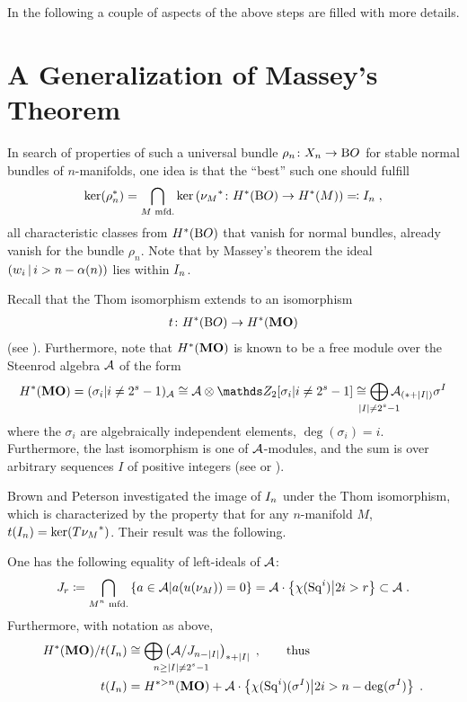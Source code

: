 In the following a couple of aspects of the above steps are filled
with more details.


\section*{A Generalization of Massey's Theorem}
In search of properties of such a universal bundle
$\rho_n\colon X_n\to\mathrm{B}O$ for stable normal bundles of $n$-manifolds,
one idea is that the \enquote{best} such one should fulfill
\begin{gather*}
  \ker({\rho}^*_n)
  = \bigcap_{\text{$M$ mfd.}}
  \ker\left({\nu_{M}}^*\colon H^*(\mathrm{B}O)\to H^*(M)\right)
  \eqqcolon I_{n}
  \;,
\end{gather*}
\idest all characteristic classes from $H^*(\mathrm{B}O)$ that vanish for
normal bundles, already vanish for the bundle $\rho_n$.
Note that by Massey's theorem the ideal
$\left(w_{i}\,\middle|\,i>n-\alpha(n)\right)$ lies within $I_{n}$.

\begin{Rem*}
Recall that the Thom isomorphism extends to an isomorphism
\begin{gather*}
  t\colon H^*(\mathrm{B}O) \to H^*(\bm{\mathrm{MO}})
\end{gather*}
(see \forexample \cite{milnor}).
Furthermore, note that $H^*(\bm{\mathrm{MO}})$ is known to be a free module
over the Steenrod algebra $\mathcal{A}$ of the form
\begin{gather*}
  \H^*(\MOspec)
  = (\sigma_i| i\neq 2^s-1)_{\A}
  \cong \A\otimes \Zmod2[\sigma_i|i\neq 2^s-1]
  \cong \bigoplus_{\mathclap{\Deg{I}\neq 2^s-1}}
  \A_{(*+\Deg{I})}\sigma^I
\end{gather*}
where the $\sigma_i$ are algebraically independent elements,
$\deg(\sigma_i)=i$.
Furthermore, the last isomorphism is one of $\mathcal{A}$-modules, and the sum
is over arbitrary sequences $I$ of positive integers
(see \forexample \cite[p.~82]{immersionconj} or
\cite[Chap.~20]{switzer}).
\end{Rem*}

Brown and Peterson investigated the image of $I_{n}$ under the Thom
isomorphism, which is characterized by the property that for any
$n$-manifold $M$, $t(I_{n})=\ker({T{\nu_{M}}}^*)$.
Their result was the following.
\begin{Thm*}
  One has the following equality of left-ideals of $\mathcal{A}$:
  \begin{gather*}
    J_{r}
    \coloneqq \bigcap_{\text{$M^n$ mfd.}}
    \left\{ a\in\mathcal{A} \middle| a({u}(\nu_{M})) = 0 \right\}
    = \mathcal{A} \cdot \left\{\chi(\mathrm{Sq}^{i}) \middle| 2i>r\right\}
    \subset \mathcal{A}
    \;.
  \end{gather*}
  Furthermore, with notation as above,
  \begin{align*}
    \H^*(\MOspec)/\thomiso(\I n)
    &\cong \bigoplus_{\mathrlap{n\geq\Deg{I}\neq 2^s-1}}
      \left( \A / \J{n-\Deg{I}} \right)_{*+\Deg{I}}
      \;,\qquad\text{thus}\\
    \thomiso(\I n)
    &= \H^{*>n}(\MOspec)
    + \A\cdot \left\{
      \antipode(\Sq i)(\sigma^I) \middle| 2i>n-\deg(\sigma^I)
    \right\}
      \;.
  \end{align*}
\end{Thm*}

